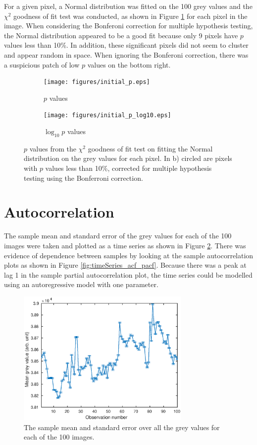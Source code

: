 \documentclass[12pt]{report}
\begin{document}
For a given pixel, a Normal distribution was fitted on the 100 grey values and the $\chi^2$ goodness of fit test was conducted, as shown in Figure \ref{fig:initial_fit_normal_test} for each pixel in the image. When considering the Bonferoni correction \cite{weisstein2004bonferroni} for multiple hypothesis testing, the Normal distribution appeared to be a good fit because only 9 pixels have $p$ values less than 10\%. In addition, these significant pixels did not seem to cluster and appear random in space. When ignoring the Bonferoni correction, there was a suspicious patch of low $p$ values on the bottom right.

\begin{figure}[p]
\centering
	\begin{subfigure}[b]{0.75\textwidth}
		\texttt{[image: figures/initial\_p.eps]}
		\caption{$p$ values}
	\end{subfigure}
	\begin{subfigure}[b]{0.75\textwidth}
		\texttt{[image: figures/initial\_p\_log10.eps]}
		\caption{$\log_{10} p$ values}
	\end{subfigure}
	\caption{$p$ values from the $\chi^2$ goodness of fit test on fitting the Normal distribution on the grey values for each pixel. In b) circled are pixels with $p$ values less than 10\%, corrected for multiple hypothesis testing using the Bonferroni correction.}
	\label{fig:initial_fit_normal_test}
\end{figure}

\section{Autocorrelation}
The sample mean and standard error of the grey values for each of the 100 images were taken and plotted as a time series as shown in Figure \ref{fig:timeSeries}. There was evidence of dependence between samples by looking at the sample autocorrelation plots as shown in Figure \ref{fig:timeSeries_acf_pacf}. Because there was a peak at lag 1 in the sample partial autocorrelation plot, the time series could be modelled using an autoregressive model with one parameter.

\begin{figure}[p]
	\centering
	\includegraphics[width=0.75\textwidth]{figures/initial_timeSeries.eps}
	\caption{The sample mean and standard error over all the grey values for each of the 100 images.}
	\label{fig:timeSeries}
\end{figure}
\end{document}
